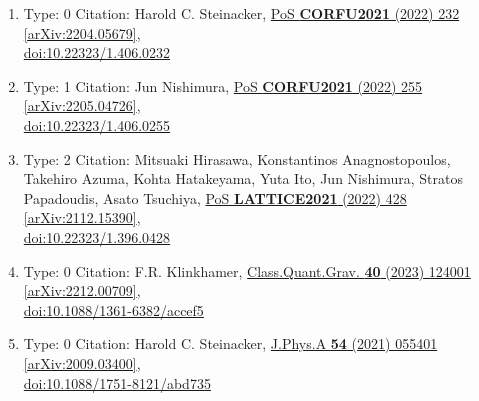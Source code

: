 \documentclass[a4paper,10pt]{article}
\begin{document}
\begin{enumerate}
\begin{enumerate}
  \item Type: 0 Citation: Harold C. Steinacker, \href{https://www.doi.org/10.22323/1.406.0232}{PoS {\bf CORFU2021} (2022) 232}  \href{https://arxiv.org/abs/2204.05679}{[arXiv:2204.05679]},\\\href{https://www.doi.org/10.22323/1.406.0232}{doi:10.22323/1.406.0232}
  \item Type: 1 Citation: Jun Nishimura, \href{https://www.doi.org/10.22323/1.406.0255}{PoS {\bf CORFU2021} (2022) 255}  \href{https://arxiv.org/abs/2205.04726}{[arXiv:2205.04726]},\\\href{https://www.doi.org/10.22323/1.406.0255}{doi:10.22323/1.406.0255}
  \item Type: 2 Citation: Mitsuaki Hirasawa, Konstantinos Anagnostopoulos, Takehiro Azuma, Kohta Hatakeyama, Yuta Ito, Jun Nishimura, Stratos Papadoudis, Asato Tsuchiya, \href{https://www.doi.org/10.22323/1.396.0428}{PoS {\bf LATTICE2021} (2022) 428}  \href{https://arxiv.org/abs/2112.15390}{[arXiv:2112.15390]},\\\href{https://www.doi.org/10.22323/1.396.0428}{doi:10.22323/1.396.0428}
  \item Type: 0 Citation: F.R. Klinkhamer, \href{https://www.doi.org/10.1088/1361-6382/accef5}{Class.Quant.Grav. {\bf 40} (2023) 124001}  \href{https://arxiv.org/abs/2212.00709}{[arXiv:2212.00709]},\\\href{https://www.doi.org/10.1088/1361-6382/accef5}{doi:10.1088/1361-6382/accef5}
  \item Type: 0 Citation: Harold C. Steinacker, \href{https://www.doi.org/10.1088/1751-8121/abd735}{J.Phys.A {\bf 54} (2021) 055401}  \href{https://arxiv.org/abs/2009.03400}{[arXiv:2009.03400]},\\\href{https://www.doi.org/10.1088/1751-8121/abd735}{doi:10.1088/1751-8121/abd735}

\end{enumerate}
\end{enumerate}
\end{document}
